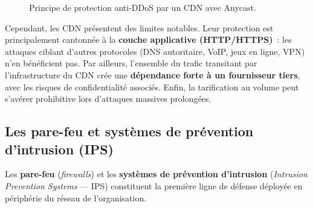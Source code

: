 \begin{figure}[H]
\centering
{}
\caption{Principe de protection anti-DDoS par un CDN avec Anycast.}
\label{fig:cdn_protection}
\end{figure}

Cependant, les CDN présentent des limites notables. Leur protection est principalement cantonnée à la \textbf{couche applicative (HTTP/HTTPS)}~: les attaques ciblant d'autres protocoles (DNS autoritaire, VoIP, jeux en ligne, VPN) n'en bénéficient pas. Par ailleurs, l'ensemble du trafic transitant par l'infrastructure du CDN crée une \textbf{dépendance forte à un fournisseur tiers}, avec les risques de confidentialité associés. Enfin, la tarification au volume peut s'avérer prohibitive lors d'attaques massives prolongées.

\subsection{Les pare-feu et systèmes de prévention d'intrusion (IPS)}

Les \textbf{pare-feu} (\textit{firewalls}) et les \textbf{systèmes de prévention d'intrusion} (\textit{Intrusion Prevention Systems} --- IPS) constituent la première ligne de défense déployée en périphérie du réseau de l'organisation.

